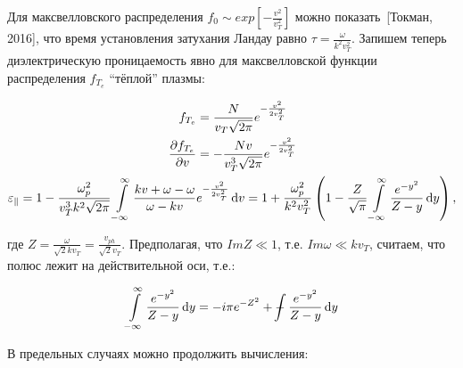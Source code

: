 \documentclass[10pt, a4paper]{article}
\def\Xint#1{\mathchoice
 {\XXint\displaystyle\textstyle{#1}}%
 {\XXint\textstyle\scriptstyle{#1}}%
 {\XXint\scriptstyle\scriptscriptstyle{#1}}%
 {\XXint\scriptscriptstyle\scriptscriptstyle{#1}}%
 \!\int}
\def\XXint#1#2#3{{\setbox0=\hbox{$#1{#2#3}{\int}$}
   \vcenter{\hbox{$#2#3$}}\kern-.5\wd0}}
\def\dashint{\Xint-}
\newcommand{\Tokman}{~[Токман, 2016]}
\begin{document}
Для максвелловского распределения $f_0\sim exp[-\frac{v^2}{v_T^2}]$ можно показать\Tokman, что время установления затухания Ландау равно $\tau = \frac{\omega}{k^2v_T^2}$. Запишем теперь диэлектрическую проницаемость явно для максвелловской функции распределения $f_{T_e}$ ``тёплой'' плазмы:

\begin{align*}
	f_{T_e} &= \frac{N}{v_T\sqrt{2\pi}} e^{-\frac{v^2}{2v_T^2}} \\
	\pdv{f_{T_e}}{v} &= -\frac{Nv}{v_T^3\sqrt{2\pi}} e^{-\frac{v^2}{2v_T^2}} \\
	\varepsilon_\parallel = 1 - \frac{\omega_p^2}{v_T^3 k^2\sqrt{2\pi}}\int\limits_{-\infty}^\infty \frac{kv + \omega - \omega}{\omega - kv} &e^{-\frac{v^2}{2v_T^2}} \dd{v} = 1 + \frac{\omega_p^2}{k^2 v_T^2} \left(1 - \frac{Z}{\sqrt{\pi}} \int\limits_{-\infty}^\infty\frac{e^{-y^2}}{Z-y}\dd{y} \right),
\end{align*} 

где $Z = \frac{\omega}{\sqrt{2}kv_T} = \frac{v_{ph}}{\sqrt{2}v_T}$. Предполагая, что $ImZ\ll 1$, т.е. $Im\omega \ll kv_T$, считаем, что полюс лежит на действительной оси, т.е.:

\begin{equation*}
	\int\limits_{-\infty}^\infty\frac{e^{-y^2}}{Z-y}\dd{y} = -i\pi e^{-Z^2} + \dashint\frac{e^{-y^2}}{Z-y}\dd{y}
\end{equation*}

В предельных случаях можно продолжить вычисления:
\end{document}
